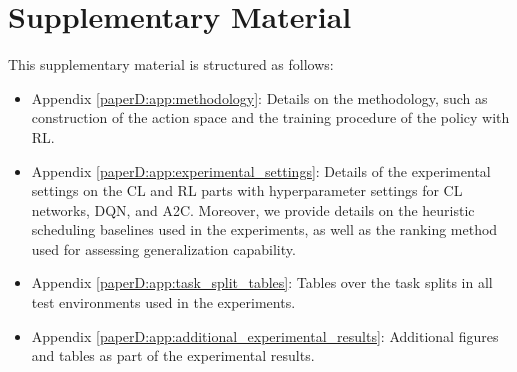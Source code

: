 
\section*{Supplementary Material}

This supplementary material is structured as follows:
\begin{itemize}
    \item Appendix \ref{paperD:app:methodology}: Details on the methodology, such as construction of the action space and the training procedure of the policy with RL.
    
    \item Appendix \ref{paperD:app:experimental_settings}: Details of the experimental settings on the CL and RL parts with hyperparameter settings for CL networks, DQN, and A2C. Moreover, we provide details on the heuristic scheduling baselines used in the experiments, as well as the ranking method used for assessing generalization capability. 
    
    \item Appendix \ref{paperD:app:task_split_tables}: Tables over the task splits in all test environments used in the experiments.  
    
    \item Appendix \ref{paperD:app:additional_experimental_results}: Additional figures and tables as part of the experimental results.  
\end{itemize}






\clearpage
%

%

%

%
\clearpage



